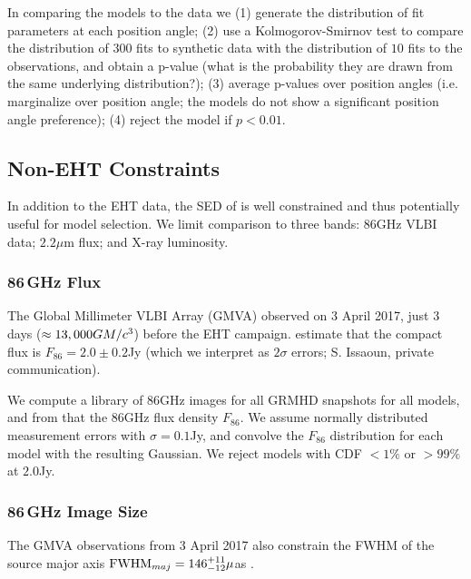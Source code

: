 In comparing the models to the data we (1) generate the distribution of fit parameters at each position angle; (2) use a Kolmogorov-Smirnov test to compare the distribution of $300$ fits to synthetic data with the distribution of $10$ fits to the observations, and obtain a p-value (what is the probability they are drawn from the same underlying distribution?); (3) average p-values over position angles (i.e. marginalize over position angle; the models do not show a significant position angle preference); (4) reject the model if $p < 0.01$.

\subsection{Non-EHT Constraints}

In addition to the EHT data, the SED of \sgra is well constrained  and thus potentially useful for model selection.  We limit comparison to three bands: 86GHz VLBI data; $2.2\mu$m flux; and X-ray luminosity.

\subsubsection{86\,GHz Flux}

The Global Millimeter VLBI Array (GMVA) observed \sgra on 3 April 2017, just 3 days ($\approx 13,000 GM/c^3$) before the EHT campaign.  \cite{2019ApJ...871...30I} estimate that the compact flux is $F_{86}=2.0 \pm 0.2$Jy (which we interpret as $2\sigma$ errors; S. Issaoun, private communication).

We compute a library of 86GHz images for all GRMHD snapshots for all models, and from that the 86GHz flux density $F_{86}$.  We assume normally distributed measurement errors with $\sigma = 0.1$Jy, and convolve the $F_{86}$ distribution for each model with the resulting Gaussian.  We reject models with CDF $< 1\%$ or $> 99\%$ at $2.0$Jy.

\subsubsection{86\,GHz Image Size}

The GMVA observations from 3 April 2017 also constrain the FWHM of the source major axis ${\rm FWHM}_{maj} = 146^{+11}_{-12}\mu$as \citep[95\% confidence][]{2021ApJ...915...99I}.

